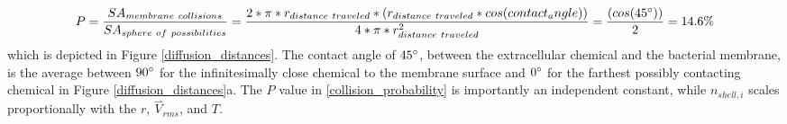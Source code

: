 \begin{supplementary}
\begin{equation} \label{collision_probability}
    P = \frac{SA_{membrane~collisions}}{SA_{sphere~of~possibilities}} = \frac{
    2*\pi*r_{distance~traveled}*(r_{distance~traveled}*cos(contact_angle))
    }{
    4*\pi*r_{distance~traveled}^2
    } = \frac{(cos(45\degree))}{2} = 14.6\%
\end{equation}
which is depicted in Figure \ref{diffusion_distances}. The contact angle of $45\degree$, between the extracellular chemical and the bacterial membrane, is the average between $90\degree$ for the infinitesimally close chemical to the membrane surface and $0\degree$ for the farthest possibly contacting chemical in Figure \ref{diffusion_distances}a. The $P$ value in \cref{collision_probability} is importantly an independent constant, while $n_{shell,i}$ scales proportionally with the $r$, $\overset{\rightharpoonup}{V}_{rms}$, and $T$. 


\end{supplementary}
